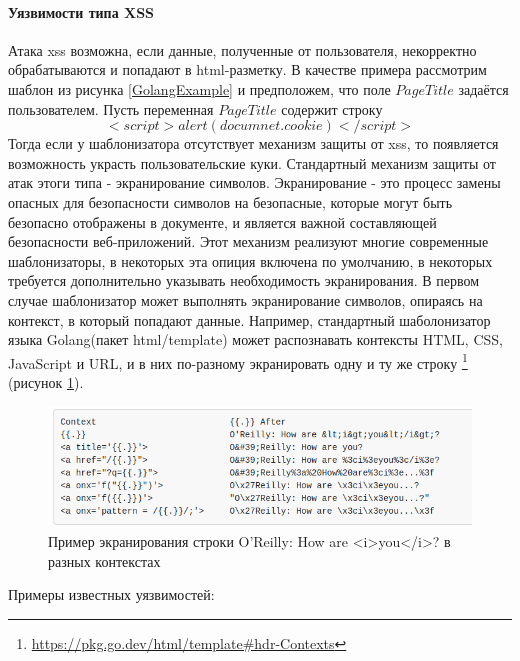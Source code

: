 \documentclass[a4paper]{article}
\begin{document}
\paragraph{Уязвимости типа XSS}
\indent

Атака xss возможна, если данные, полученные от пользователя, некорректно обрабатываются и попадают в html-разметку. В качестве примера рассмотрим шаблон из рисунка \ref{GolangExample} и предположем, что поле $PageTitle$ задаётся пользователем. Пусть переменная $PageTitle$ содержит строку $$<script>alert(documnet.cookie)</script>$$ Тогда если у шаблонизатора отсутствует механизм защиты от xss, то появляется возможность украсть пользовательские куки. Стандартный механизм защиты от атак этоги типа - экранирование символов. Экранирование - это процесс замены опасных для безопасности символов на безопасные, которые могут быть безопасно отображены в документе, и является важной составляющей безопасности веб-приложений. Этот механизм реализуют многие современные шаблонизаторы, в некоторых эта опиция включена по умолчанию, в некоторых требуется дополнительно указывать необходимость экранирования. В первом случае шаблонизатор может выполнять экранирование символов, опираясь на контекст, в который попадают данные. Например, стандартный шаболонизатор языка Golang(пакет html/template) может распознавать контексты HTML, CSS, JavaScript и URL, и в них по-разному экранировать одну и ту же строку \footnote{\href{https://pkg.go.dev/html/template\#hdr-Contexts}{https://pkg.go.dev/html/template\#hdr-Contexts}} (рисунок \ref{GoEscaping}).

\begin{figure}[ht!]
    \includegraphics[width=140mm]{GoEscaping.png}
    \caption{Пример экранирования строки O'Reilly: How are <i>you</i>? в разных контекстах}
    \label{GoEscaping}
    \end{figure}

Примеры известных уязвимостей:
\end{document}
